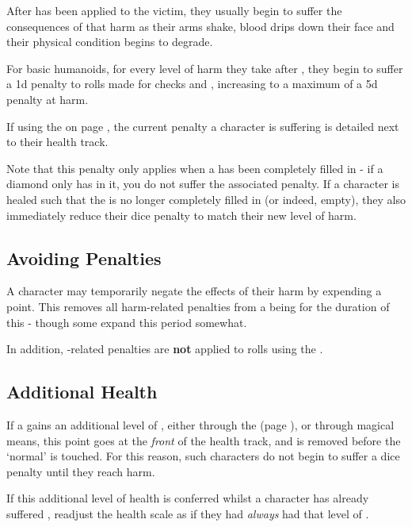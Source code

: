 After  has been applied to the victim, they usually begin to suffer the consequences of that harm as their arms shake, blood drips down their face and their physical condition begins to degrade. 

For basic humanoids, for every level of harm they take after , they begin to suffer a 1d penalty to rolls made for  checks and , increasing to a maximum of a 5d penalty at  harm. 

If using the  on page \pageref{S:CharacterSheet}, the current penalty a character is suffering is detailed next to their health track. 

Note that this penalty only applies when a  has been completely filled in - if a diamond only has  in it, you do not suffer the associated penalty. If a character is healed such that the  is no longer completely filled in (or indeed, empty), they also immediately reduce their dice penalty to match their new level of harm. 

\subsection{Avoiding Penalties}

A character may temporarily negate the effects of their harm by expending a  point. This removes all harm-related penalties from a being for the duration of this  - though some  expand this period somewhat. 

In addition, -related penalties are {\bf not} applied to  rolls using the . 

\subsection{Additional Health}

If a  gains an additional level of , either through the  (page \pageref{S:Progression}), or through magical means, this point goes at the {\it front} of the health track, and is removed before the `normal'  is touched. For this reason, such characters do not begin to suffer a dice penalty until they reach  harm. 

If this additional level of health is conferred whilst a character has already suffered , readjust the health scale  as if they had {\it always} had that level of . 

